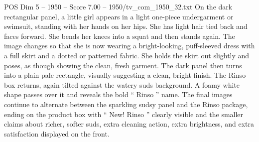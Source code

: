 \begin{textsample}{POS Dim 5 – 1950 – Score 7.00 – 1950/tv\_com\_1950\_32.txt}
On the dark rectangular panel, a little girl appears in a light one-piece undergarment or swimsuit, standing with her hands on her hips.
She has light hair tied back and faces forward.
She bends her knees into a squat and then stands again.
The image changes so that she is now wearing a bright-looking, puff-sleeved dress with a full skirt and a dotted or patterned fabric.
She holds the skirt out slightly and poses, as though showing the clean, fresh garment.
The dark panel then turns into a plain pale rectangle, visually suggesting a clean, bright finish.
The Rinso box returns, again tilted against the watery suds background.
A foamy white shape passes over it and reveals the bold “ Rinso ” name.
The final images continue to alternate between the sparkling sudsy panel and the Rinso package, ending on the product box with “ New!
Rinso ” clearly visible and the smaller claims about richer, softer suds, extra cleaning action, extra brightness, and extra satisfaction displayed on the front.

\end{textsample}
